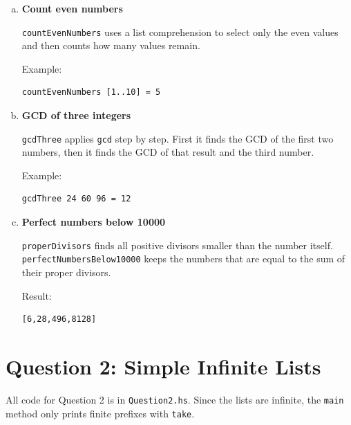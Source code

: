 \documentclass{article}
\begin{document}
\begin{enumerate}[(a)]
\item \textbf{Count even numbers}

\texttt{countEvenNumbers} uses a list comprehension to select only the even values and then counts how many values remain.

Example:
\begin{verbatim}
countEvenNumbers [1..10] = 5
\end{verbatim}

\item \textbf{GCD of three integers}

\texttt{gcdThree} applies \texttt{gcd} step by step. First it finds the GCD of the first two numbers, then it finds the GCD of that result and the third number.

Example: 
\begin{verbatim}
gcdThree 24 60 96 = 12
\end{verbatim}

\item \textbf{Perfect numbers below 10000}

\texttt{properDivisors} finds all positive divisors smaller than the number itself. \texttt{perfectNumbersBelow10000} keeps the numbers that are equal to the sum of their proper divisors.

Result:
\begin{verbatim}
[6,28,496,8128]
\end{verbatim}

\end{enumerate}

\section*{Question 2: Simple Infinite Lists}

All code for Question 2 is in \texttt{Question2.hs}. Since the lists are infinite, the \texttt{main} method only prints finite prefixes with \texttt{take}.
\end{document}
